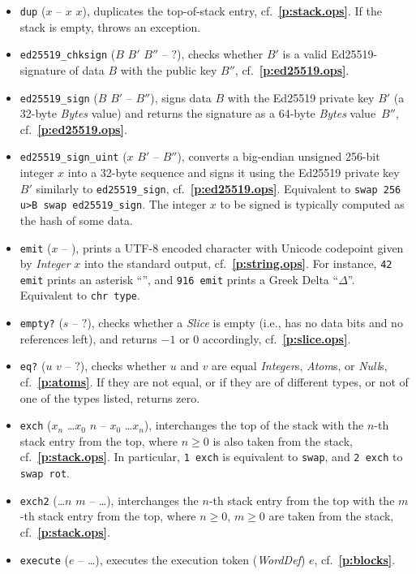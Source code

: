 \documentclass[12pt,oneside]{article}
\def\refpoint#1{{\rm\textbf{\ref{#1}}}}
\let\ptref=\refpoint
\begin{document}
\begin{itemize}
\item {\tt dup} ($x$ -- $x$ $x$), duplicates the top-of-stack entry, cf.~\ptref{p:stack.ops}. If the stack is empty, throws an exception.
\item {\tt ed25519\_chksign} ($B$ $B'$ $B''$ -- $?$), checks whether $B'$ is a valid Ed25519-signature of data $B$ with the public key $B''$, cf.~\ptref{p:ed25519.ops}.
\item {\tt ed25519\_sign} ($B$ $B'$ -- $B''$), signs data $B$ with the Ed25519 private key $B'$ (a 32-byte {\em Bytes\/} value) and returns the signature as a 64-byte {\em Bytes\/} value~$B''$, cf.~\ptref{p:ed25519.ops}.
\item {\tt ed25519\_sign\_uint} ($x$ $B'$ -- $B''$), converts a big-endian unsigned 256-bit integer $x$ into a 32-byte sequence and signs it using the Ed25519 private key $B'$ similarly to {\tt ed25519\_sign}, cf.~\ptref{p:ed25519.ops}. Equivalent to {\tt swap 256 u>B swap ed25519\_sign}. The integer $x$ to be signed is typically computed as the hash of some data.
\item {\tt emit} ($x$ -- ), prints a UTF-8 encoded character with Unicode codepoint given by {\em Integer\/} $x$ into the standard output, cf.~\ptref{p:string.ops}. For instance, {\tt 42 emit} prints an asterisk ``{\tt *}'', and {\tt 916 emit} prints a Greek Delta ``{\tt $\Delta$}''. Equivalent to {\tt chr type}.
\item {\tt empty?} ($s$ -- $?$), checks whether a {\em Slice\/} is empty (i.e., has no data bits and no references left), and returns $-1$ or $0$ accordingly, cf.~\ptref{p:slice.ops}.
\item {\tt eq?} ($u$ $v$ -- $?$), checks whether $u$ and $v$ are equal {\em Integer\/}s, {\em Atom\/}s, or {\em Null\/}s, cf.~\ptref{p:atoms}. If they are not equal, or if they are of different types, or not of one of the types listed, returns zero.
\item {\tt exch} ($x_n$ \dots $x_0$ $n$ -- $x_0$ \dots $x_n$), interchanges the top of the stack with the $n$-th stack entry from the top, where $n\geq0$ is also taken from the stack, cf.~\ptref{p:stack.ops}. In particular, {\tt 1 exch} is equivalent to {\tt swap}, and {\tt 2 exch} to {\tt swap rot}.
\item {\tt exch2} (\dots $n$ $m$ -- \dots), interchanges the $n$-th stack entry from the top with the $m$-th stack entry from the top, where $n\geq0$, $m\geq0$ are taken from the stack, cf.~\ptref{p:stack.ops}.
\item {\tt execute} ($e$ -- \dots), executes the execution token ({\em WordDef\/}) $e$, cf.~\ptref{p:blocks}.

\end{itemize}
\end{document}
